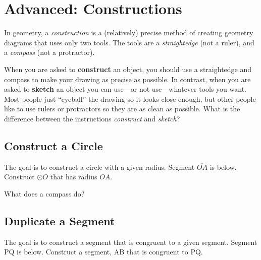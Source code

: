 			\section{Advanced:  Constructions}

In geometry, a \emph{construction} is a (relatively) precise method of creating geometry diagrams that uses only two tools.  The tools are a \emph{straightedge} (not a ruler), and a \emph{compass} (not a protractor).

When you are asked to \textbf{construct} an object, you should use a straightedge and compass to make your drawing as precise as possible.  In contrast, when you are asked to \textbf{sketch} an object you can use---or not use---whatever tools you want. Most people just ``eyeball'' the drawing so it looks close enough, but other people like to use rulers or protractors so they are as clean as possible. \q What is the difference between the instructions \emph{construct} and \emph{sketch}?

\newpage

\subsection{Construct a Circle}
The goal is to construct a circle with a given radius.  Segment $\overline{OA}$ is below. \q Construct $\odot O$ that has radius $OA$.

\vspace{1.25cm}

\begin{center}
\end{center}

\vspace{1cm}

\noindent \q What does a compass do?

\subsection{Duplicate a Segment}
The goal is to construct a segment that is congruent to a given segment.  Segment \seg PQ is below. \q Construct a segment, \seg AB that is congruent to \seg PQ.

